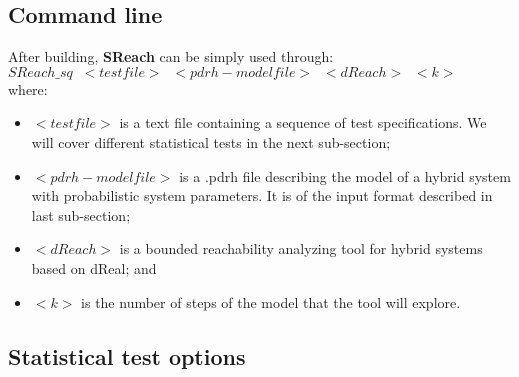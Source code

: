 \documentclass[runningheads,a4paper]{llncs}
\begin{document}
\begin{comment}
 \indent d/dt\left[ tau\right[  = scale * 1.0;\\
jump:\\
 \indent (and (v <= r0) (((((Gx - Mxy) * x) + c1 * x) + (((Mxy * x) + Gy * y ) + c2 * y)) < 0)) ==> @1 (and (tau' = tau) (x' = x) (y'= y) (z' = z) (v' = v));\\
\}\\
// set\; initial\; values\\
init:\\
@2	(and (x = 15) (y = 0.1) (z = 30) (v = 15.1) (tau = 0));\\
// the\; reachability\; property\\
goal:\\
@2	(and (x >= 0.0) (y >= 0.0) (z >= 0.0) (v >= 0.0) (tau = 400.0));\\
$
\noindent\rule{\textwidth}{0.7pt}
\end{example}

\end{comment}

\subsection{Command line}
After building, {\bf SReach} can be simply used through:\\

{\bf   
$SReach\_sq\;\; <testfile> \;\;<pdrh-modelfile> \;\;<dReach>\;\;<k> $
}\\

where:
\begin{itemize}
\item $<testfile>$ is a text file containing a sequence of test specifications. We will cover different statistical tests in the next sub-section;
\item $<pdrh-modelfile>$ is a .pdrh file describing the model of a hybrid system with probabilistic system parameters. It is of the input format described in last sub-section;
\item $<dReach>$ is a bounded reachability analyzing tool for hybrid systems based on dReal; and
\item $<k>$ is the number of steps of the model that the tool will explore.\\
\end{itemize}


\subsection{Statistical test options}
\end{document}
